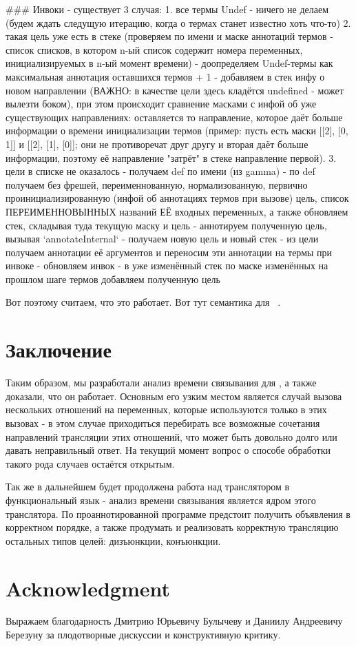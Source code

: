 \documentclass[conference]{IEEEtran}
\begin{document}
### Инвоки
- существует 3 случая:
1. все термы Undef
  - ничего не делаем (будем ждать следущую итерацию, когда о термах станет известно хоть что-то)
2. такая цель уже есть в стеке (проверяем по имени и маске аннотаций термов - список списков, в котором n-ый список содержит номера переменных, инициализируемых в n-ый момент времени)
  - доопределяем Undef-термы как максимальная аннотация оставшихся термов + 1
  - добавляем в стек инфу о новом направлении (ВАЖНО: в качестве цели здесь кладётся undefined - может вылезти боком), при этом происходит сравнение масками с инфой об уже существующих направлениях: оставляется то направление, которое даёт больше информации о времени инициализации термов (пример: пусть есть маски [[2], [0, 1]] и [[2], [1], [0]]; они не противоречат друг другу и вторая даёт больше информации, поэтому её направление "затрёт" в стеке направление первой).
3. цели в списке не оказалось
  - получаем def по имени (из gamma)
  - по def получаем без фрешей, переименнованную, нормализованную, первично проинициализированную (инфой об аннотациях термов при вызове) цель, список ПЕРЕИМЕННОВЫННЫХ названий ЕЁ входных переменных, а также обновляем стек, складывая туда текущую маску и цель
  - аннотируем полученную цель, вызывая `annotateInternal` - получаем новую цель и новый стек
  - из цели получаем аннотации её аргументов и переносим эти аннотации на термы при инвоке - обновляем инвок
  - в уже изменённый стек по маске изменённых на прошлом шаге термов добавляем полученную цель


Вот поэтому считаем, что это работает. Вот тут семантика для \miniKanren~\cite{rozplokhas2019certified}.

\section{Заключение}

Таким образом, мы разработали анализ времени связывания для \miniKanren, а также доказали, что он работает. Основным его узким местом является случай вызова нескольких отношений на переменных, которые используются только в этих вызовах - в этом случае приходиться перебирать все возможные сочетания направлений трансляции этих отношений, что может быть довольно долго или давать неправильный ответ. На текущий момент вопрос о способе обработки такого рода случаев остаётся открытым.

Так же в дальнейшем будет продолжена работа над транслятором в функциональный язык - анализ времени связывания является ядром этого транслятора. По проаннотированной программе предстоит получить объявления в корректном порядке, а также продумать и реализовать корректную трансляцию остальных типов целей: дизъюнкции, конъюнкции.

\section*{Acknowledgment}

Выражаем благодарность Дмитрию Юрьевичу Булычеву и Даниилу Андреевичу Березуну за плодотворные дискуссии и конструктивную критику.



\end{document}
